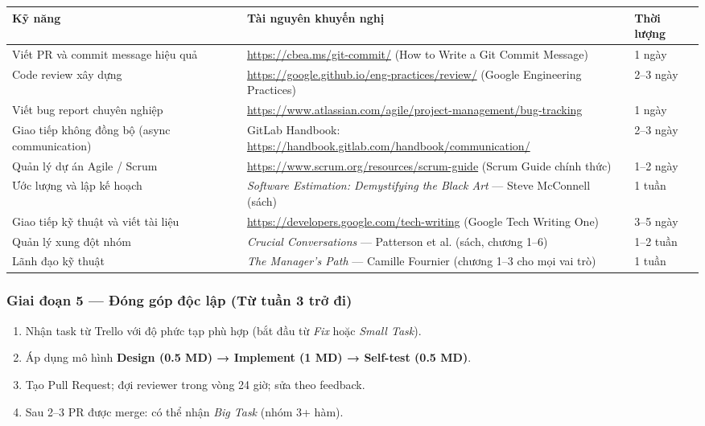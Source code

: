 \documentclass[12pt,a4paper]{article}
\begin{document}
\vspace{2pt}
\begin{tabularx}{\linewidth}{|l|X|l|}
\hline
\rowcolor{gray!20}
\textbf{Kỹ năng} & \textbf{Tài nguyên khuyến nghị} & \textbf{Thời lượng} \\
\hline
Viết PR và commit message hiệu quả
    & \url{https://cbea.ms/git-commit/} (How to Write a Git Commit Message)
    & 1 ngày \\
\hline
Code review xây dựng
    & \url{https://google.github.io/eng-practices/review/} (Google Engineering Practices)
    & 2--3 ngày \\
\hline
Viết bug report chuyên nghiệp
    & \url{https://www.atlassian.com/agile/project-management/bug-tracking}
    & 1 ngày \\
\hline
Giao tiếp không đồng bộ (async communication)
    & GitLab Handbook: \url{https://handbook.gitlab.com/handbook/communication/}
    & 2--3 ngày \\
\hline
Quản lý dự án Agile / Scrum
    & \url{https://www.scrum.org/resources/scrum-guide} (Scrum Guide chính thức)
    & 1--2 ngày \\
\hline
Ước lượng và lập kế hoạch
    & \textit{Software Estimation: Demystifying the Black Art} --- Steve McConnell (sách)
    & 1 tuần \\
\hline
Giao tiếp kỹ thuật và viết tài liệu
    & \url{https://developers.google.com/tech-writing} (Google Tech Writing One)
    & 3--5 ngày \\
\hline
Quản lý xung đột nhóm
    & \textit{Crucial Conversations} --- Patterson et al. (sách, chương 1--6)
    & 1--2 tuần \\
\hline
Lãnh đạo kỹ thuật
    & \textit{The Manager's Path} --- Camille Fournier (chương 1--3 cho mọi vai trò)
    & 1 tuần \\
\hline
\end{tabularx}

\subsubsection{Giai đoạn 5 --- Đóng góp độc lập (Từ tuần 3 trở đi)}

\begin{enumerate}[nosep]
    \item Nhận task từ Trello với độ phức tạp phù hợp (bắt đầu từ \textit{Fix} hoặc \textit{Small Task}).
    \item Áp dụng mô hình \textbf{Design (0.5 MD) → Implement (1 MD) → Self-test (0.5 MD)}.
    \item Tạo Pull Request; đợi reviewer trong vòng 24 giờ; sửa theo feedback.
    \item Sau 2--3 PR được merge: có thể nhận \textit{Big Task} (nhóm 3+ hàm).
\end{enumerate}
\end{document}
